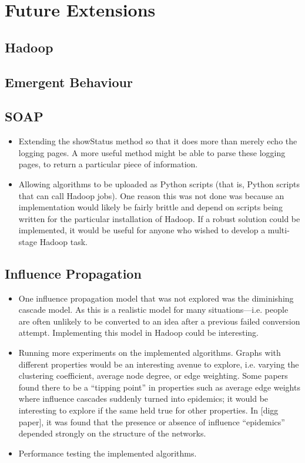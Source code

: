 \section{Future Extensions}


\subsection{Hadoop}

\subsection{Emergent Behaviour}

\subsection{SOAP}

\begin{itemize}
	\item Extending the showStatus method so that it does more than merely echo the logging pages. A more useful method might be able to parse these logging pages, to return a particular piece of information.
	\item Allowing algorithms to be uploaded as Python scripts (that is, Python scripts that can call Hadoop jobs). One reason this was not done was because an implementation would likely be fairly brittle and depend on scripts being written for the particular installation of Hadoop. If a robust solution could be implemented, it would be useful for anyone who wished to develop a multi-stage Hadoop task. 
\end{itemize}

\subsection{Influence Propagation}

\begin{itemize}
	\item One influence propagation model that was not explored was the diminishing cascade model. As this is a realistic model for many situations---i.e. people are often unlikely to be converted to an idea after a previous failed conversion attempt. Implementing this model in Hadoop could be interesting.
	\item Running more experiments on the implemented algorithms. Graphs with different properties would be an interesting avenue to explore, i.e. varying the clustering coefficient, average node degree, or edge weighting. Some papers found there to be a ``tipping point'' in properties such as average edge weights where influence cascades suddenly turned into epidemics; it would be interesting to explore if the same held true for other properties. In [digg paper], it was found that the presence or absence of influence ``epidemics'' depended strongly on the structure of the networks.
	\item Performance testing the implemented algorithms.
\end{itemize}

